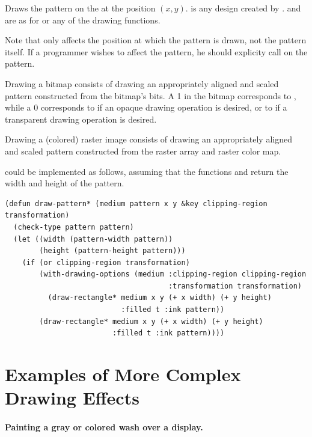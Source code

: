 Draws the pattern  on the   at the
position $(x,y)$.  is any design created by .
 and  are as for
 or any of the drawing functions.

Note that  only affects the position at which the pattern is
drawn, not the pattern itself.  If a programmer wishes to affect the pattern, he
should explicity call  on the pattern.

Drawing a bitmap consists of drawing an appropriately aligned and scaled pattern
constructed from the bitmap's bits.  A 1 in the bitmap corresponds to
, while a 0 corresponds to  if an
opaque drawing operation is desired, or to  if a transparent
drawing operation is desired.

Drawing a (colored) raster image consists of drawing an appropriately aligned
and scaled pattern constructed from the raster array and raster color map.

 could be implemented as follows, assuming that the functions
 and  return the width and height of the
pattern.

\begin{verbatim}
(defun draw-pattern* (medium pattern x y &key clipping-region transformation)
  (check-type pattern pattern)
  (let ((width (pattern-width pattern))
        (height (pattern-height pattern)))
    (if (or clipping-region transformation)
        (with-drawing-options (medium :clipping-region clipping-region
                                      :transformation transformation)
          (draw-rectangle* medium x y (+ x width) (+ y height)
                           :filled t :ink pattern))
        (draw-rectangle* medium x y (+ x width) (+ y height)
                         :filled t :ink pattern))))
\end{verbatim}


\section {Examples of More Complex Drawing Effects}

\paragraph {Painting a gray or colored wash over a display.}


